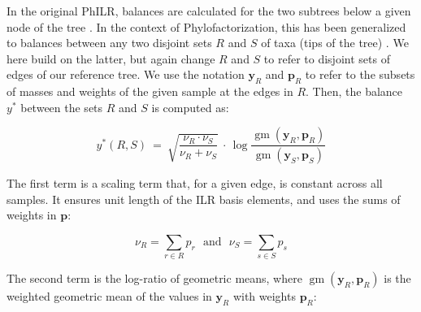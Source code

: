 In the original PhILR, balances are calculated for the two subtrees below a given node of the tree \cite{Silverman2017}.
In the context of Phylofactorization, this has been generalized
to balances between any two disjoint sets $R$ and $S$ of taxa (tips of the tree) \cite{Washburne2017a}.
We here build on the latter, but again change $R$ and $S$ to refer to disjoint sets of edges of our reference tree.
We use the notation $\bm{y}_R$ and $\bm{p}_R$ to refer
to the subsets of masses and weights of the given sample at the edges in $R$.
Then, the balance $y^*$ between the sets $R$ and $S$ is computed as:

\begin{equation}
    \label{ch:MaterialsMethods:sec:Balances:eq:Balance}
    y^*( R, S ) ~=~ \sqrt{ \frac{ \nu_R \cdot \nu_S }{ \nu_R + \nu_S }} ~\cdot\,
                \log \frac{ \operatorname{gm}( \bm{y}_R, \bm{p}_{R} ) }{ \operatorname{gm}( \bm{y}_S, \bm{p}_{S} ) }
\end{equation}

The first term is a scaling term that, for a given edge, is constant across all samples.
It ensures unit length of the ILR basis elements, and uses the sums of weights in $\bm{p}$:

\begin{equation}
    \label{ch:MaterialsMethods:sec:Balances:eq:WeightSums}
    \nu_R = \sum_{r \in R} p_r  ~~~\mbox{and}~~~  \nu_S = \sum_{s \in S} p_s
\end{equation}

The second term is the log-ratio of geometric means, where $\operatorname{gm}( \bm{y}_R, \bm{p}_R )$
is the weighted geometric mean of the values in $\bm{y}_R$ with weights $\bm{p}_R$:

